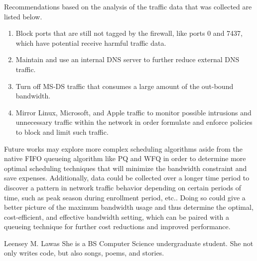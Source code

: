 \documentclass[journal]{IEEE/IEEEtran}
\newcommand{\ADVISEE}{Leensey M. Lawas}
\begin{document}
Recommendations based on the analysis of the traffic data that was collected are listed below.
\begin{enumerate}
\item Block ports that are still not tagged by the firewall, like ports 0 and 7437, which have potential receive harmful traffic data.
\item Maintain and use an internal DNS server to further reduce external DNS traffic.
\item Turn off MS-DS traffic that consumes a large amount of the out-bound bandwidth.
\item Mirror Linux, Microsoft, and Apple traffic to monitor possible intrusions and unnecessary traffic within the network in order formulate and enforce policies to block and limit such traffic.
\end{enumerate}

Future works may explore more complex scheduling algorithms aside from the native FIFO queueing algorithm like PQ and WFQ in order to determine more optimal scheduling techniques that will minimize the bandwidth constraint and save expenses. Additionally, data could be collected over a longer time period to discover a pattern in network traffic behavior depending on certain periods of time, such as peak season during enrollment period, etc.. Doing so could give a better picture of the maximum bandwidth usage and thus determine the optimal, cost-efficient, and effective bandwidth setting, which can be paired with a queueing technique for further cost reductions and improved performance.




\begin{biography}{\ADVISEE}
She is a BS Computer Science undergraduate student. She not only writes code, but also songs, poems, and stories.
\end{biography}
\end{document}
